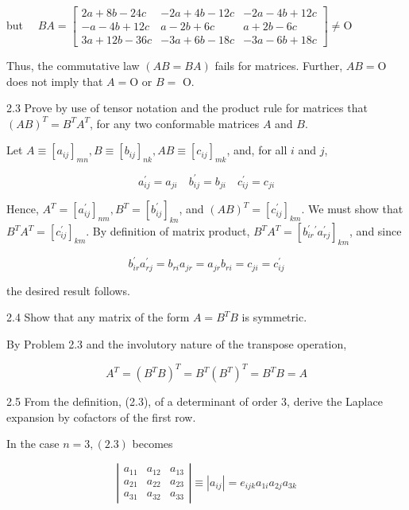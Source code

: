 \documentclass[10pt]{article}
\begin{document}
but $\quad B A=\left[\begin{array}{ccc}2 a+8 b-24 c & -2 a+4 b-12 c & -2 a-4 b+12 c \\ -a-4 b+12 c & a-2 b+6 c & a+2 b-6 c \\ 3 a+12 b-36 c & -3 a+6 b-18 c & -3 a-6 b+18 c\end{array}\right] \neq \mathrm{O}$

Thus, the commutative law $(A B=B A)$ fails for matrices. Further, $A B=\mathrm{O}$ does not imply that $A=\mathrm{O}$ or $B=$ O.

2.3 Prove by use of tensor notation and the product rule for matrices that $(A B)^{T}=B^{T} A^{T}$, for any two conformable matrices $A$ and $B$.

Let $A \equiv\left[a_{i j}\right]_{m n}, B \equiv\left[b_{i j}\right]_{n k}, A B \equiv\left[c_{i j}\right]_{m k}$, and, for all $i$ and $j$,

$$
a_{i j}^{\prime}=a_{j i} \quad b_{i j}^{\prime}=b_{j i} \quad c_{i j}^{\prime}=c_{j i}
$$

Hence, $A^{T}=\left[a_{i j}^{\prime}\right]_{n m}, B^{T}=\left[b_{i j}^{\prime}\right]_{k n}$, and $(A B)^{T}=\left[c_{i j}^{\prime}\right]_{k m}$. We must show that $B^{T} A^{T}=\left[c_{i j}^{\prime}\right]_{k m}$. By definition of matrix product, $B^{T} A^{T}=\left[b_{i r}^{\prime}{ }^{\prime} a_{r j}^{\prime}\right]_{k m}$, and since

$$
b_{i r}^{\prime} a_{r j}^{\prime}=b_{r i} a_{j r}=a_{j r} b_{r i}=c_{j i}=c_{i j}^{\prime}
$$

the desired result follows.

2.4 Show that any matrix of the form $A=B^{T} B$ is symmetric.

By Problem 2.3 and the involutory nature of the transpose operation,

$$
A^{T}=\left(B^{T} B\right)^{T}=B^{T}\left(B^{T}\right)^{T}=B^{T} B=A
$$

2.5 From the definition, (2.3), of a determinant of order 3, derive the Laplace expansion by cofactors of the first row.

In the case $n=3,(2.3)$ becomes

$$
\left|\begin{array}{lll}
a_{11} & a_{12} & a_{13} \\
a_{21} & a_{22} & a_{23} \\
a_{31} & a_{32} & a_{33}
\end{array}\right| \equiv\left|a_{i j}\right|=e_{i j k} a_{1 i} a_{2 j} a_{3 k}
$$
\end{document}
